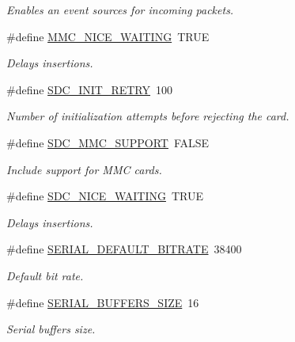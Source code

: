 \begin{DoxyCompactItemize}
\begin{DoxyCompactList}\small\item\em Enables an event sources for incoming packets. \end{DoxyCompactList}\item 
\#define \hyperlink{group__HAL__CONF_ga3087dfffa81dd8a0a80ee92746e65fe2}{M\+M\+C\+\_\+\+N\+I\+C\+E\+\_\+\+W\+A\+I\+T\+I\+N\+G}~T\+R\+U\+E
\begin{DoxyCompactList}\small\item\em Delays insertions. \end{DoxyCompactList}\item 
\#define \hyperlink{group__HAL__CONF_ga8d39f0c9799062f0698d97c26e6fa42d}{S\+D\+C\+\_\+\+I\+N\+I\+T\+\_\+\+R\+E\+T\+R\+Y}~100
\begin{DoxyCompactList}\small\item\em Number of initialization attempts before rejecting the card. \end{DoxyCompactList}\item 
\#define \hyperlink{group__HAL__CONF_ga4f938eff7370feb8de8411e255d21b01}{S\+D\+C\+\_\+\+M\+M\+C\+\_\+\+S\+U\+P\+P\+O\+R\+T}~F\+A\+L\+S\+E
\begin{DoxyCompactList}\small\item\em Include support for M\+M\+C cards. \end{DoxyCompactList}\item 
\#define \hyperlink{group__HAL__CONF_ga3391c832c171a8606b0fc864766f08ba}{S\+D\+C\+\_\+\+N\+I\+C\+E\+\_\+\+W\+A\+I\+T\+I\+N\+G}~T\+R\+U\+E
\begin{DoxyCompactList}\small\item\em Delays insertions. \end{DoxyCompactList}\item 
\#define \hyperlink{group__HAL__CONF_gacb4c08ac23f83ac9d58c50ff840de516}{S\+E\+R\+I\+A\+L\+\_\+\+D\+E\+F\+A\+U\+L\+T\+\_\+\+B\+I\+T\+R\+A\+T\+E}~38400
\begin{DoxyCompactList}\small\item\em Default bit rate. \end{DoxyCompactList}\item 
\#define \hyperlink{group__HAL__CONF_ga81a9fb00c7a1ce0fe70f263d8fd820e8}{S\+E\+R\+I\+A\+L\+\_\+\+B\+U\+F\+F\+E\+R\+S\+\_\+\+S\+I\+Z\+E}~16
\begin{DoxyCompactList}\small\item\em Serial buffers size. \end{DoxyCompactList}\item 

\end{DoxyCompactItemize}

